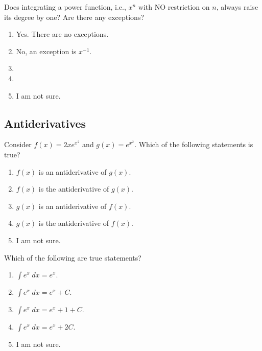 \documentclass[aspectratio=169, 14pt, t]{beamer}  %
\begin{document}
\begin{poll}
  Does integrating a {\color{red} power function}, i.e., \(x^{n}\) with NO restriction on \(n\), always raise its degree by one? Are there any exceptions?

  \begin{enumerate}
    \item Yes. There are no exceptions.
    \item No, an exception is \(x^{-1}\).
    \item
    \item
    \item I am not sure.
  \end{enumerate}
\end{poll}

\subsection{Antiderivatives}

\begin{poll}
  Consider \(f(x) = 2x e^{x^{2}}\) and \(g(x) = e^{x^{2}}\). Which of the following statements is true?

  \begin{enumerate}
    \item \(f(x)\) is an antiderivative of \(g(x)\).
    \item \(f(x)\) is the antiderivative of \(g(x)\).
    \item \(g(x)\) is an antiderivative of \(f(x)\).
    \item \(g(x)\) is the antiderivative of \(f(x)\).
    \item I am not sure.
  \end{enumerate}
\end{poll}

\begin{poll}
  Which of the following are true statements?

  \begin{enumerate}
    \item \(\int e^{x} \;dx = e^{x}\).
    \item \(\int e^{x} \;dx = e^{x} + C\).
    \item \(\int e^{x} \;dx = e^{x} + 1 + C\).
    \item \(\int e^{x} \;dx = e^{x} + 2C\).
    \item I am not sure.
  \end{enumerate}
\end{poll}
\end{document}
